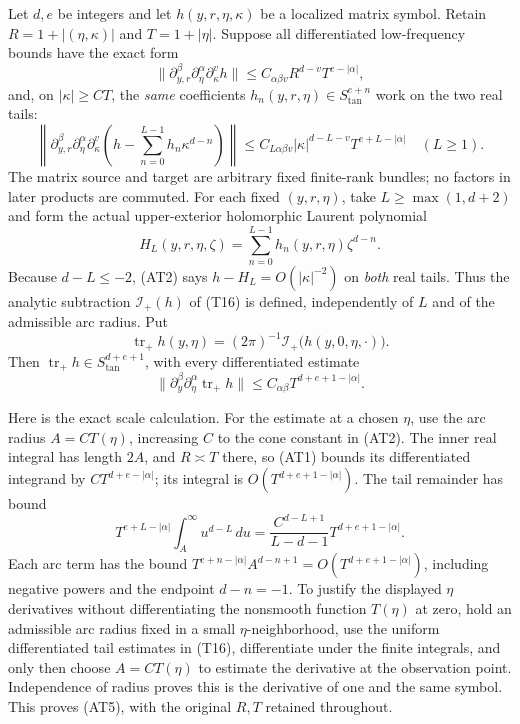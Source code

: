 \documentclass[
  11pt,
]{article}
\begin{document}
Let \(d,e\) be integers and let \(h(y,r,\eta,\kappa)\) be a localized
matrix symbol. Retain \(R=1+|(\eta,\kappa)|\) and \(T=1+|\eta|\).
Suppose all differentiated low-frequency bounds have the exact form \[
 \|\partial_{y,r}^{\beta}\partial_\eta^\alpha\partial_\kappa^v h\|
 \leq C_{\alpha\beta v}R^{d-v}T^{e-|\alpha|},
 \tag{AT1}
\] and, on \(|\kappa|\geq CT\), the \emph{same} coefficients
\(h_n(y,r,\eta)\in S_{\mathrm{tan}}^{e+n}\) work on the two real tails:
\[
 \left\|\partial_{y,r}^{\beta}\partial_\eta^\alpha\partial_\kappa^v
 \left(h-\sum_{n=0}^{L-1}h_n\kappa^{d-n}\right)\right\|
 \leq C_{L\alpha\beta v}|\kappa|^{d-L-v}T^{e+L-|\alpha|}
 \quad(L\geq1).
 \tag{AT2}
\] The matrix source and target are arbitrary fixed finite-rank bundles;
no factors in later products are commuted. For each fixed
\((y,r,\eta)\), take \(L\geq\max(1,d+2)\) and form the actual
upper-exterior holomorphic Laurent polynomial \[
 H_L(y,r,\eta,\zeta)=\sum_{n=0}^{L-1}h_n(y,r,\eta)\zeta^{d-n}.
 \tag{AT3}
\] Because \(d-L\leq-2\), (AT2) says \(h-H_L=O(|\kappa|^{-2})\) on
\emph{both} real tails. Thus the analytic subtraction
\(\mathcal I_+(h)\) of (T16) is defined, independently of \(L\) and of
the admissible arc radius. Put \[
 \operatorname{tr}_+h(y,\eta)
   =(2\pi)^{-1}\mathcal I_+\bigl(h(y,0,\eta,\cdot)\bigr).
 \tag{AT4}
\] Then \(\operatorname{tr}_+h\in S_{\mathrm{tan}}^{d+e+1}\), with every
differentiated estimate \[
 \|\partial_y^\beta\partial_\eta^\alpha\operatorname{tr}_+h\|
 \leq C_{\alpha\beta}T^{d+e+1-|\alpha|}.
 \tag{AT5}
\]

Here is the exact scale calculation. For the estimate at a chosen
\(\eta\), use the arc radius \(A=CT(\eta)\), increasing \(C\) to the
cone constant in (AT2). The inner real integral has length \(2A\), and
\(R\asymp T\) there, so (AT1) bounds its differentiated integrand by
\(CT^{d+e-|\alpha|}\); its integral is \(O(T^{d+e+1-|\alpha|})\). The
tail remainder has bound \[
 T^{e+L-|\alpha|}\int_A^\infty u^{d-L}\,du
 =\frac{C^{d-L+1}}{L-d-1}T^{d+e+1-|\alpha|}.
 \tag{AT6}
\] Each arc term has the bound
\(T^{e+n-|\alpha|}A^{d-n+1}=O(T^{d+e+1-|\alpha|})\), including negative
powers and the endpoint \(d-n=-1\). To justify the displayed \(\eta\)
derivatives without differentiating the nonsmooth function \(T(\eta)\)
at zero, hold an admissible arc radius fixed in a small
\(\eta\)-neighborhood, use the uniform differentiated tail estimates in
(T16), differentiate under the finite integrals, and only then choose
\(A=CT(\eta)\) to estimate the derivative at the observation point.
Independence of radius proves this is the derivative of one and the same
symbol. This proves (AT5), with the original \(R,T\) retained
throughout.
\end{document}
